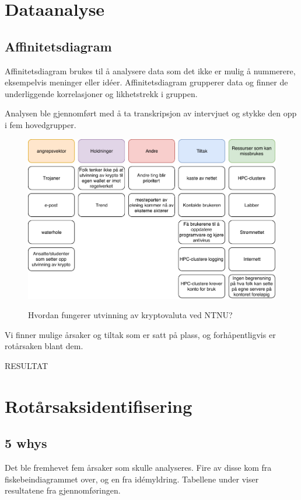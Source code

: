 \section{Dataanalyse}
\subsection{Affinitetsdiagram}
Affinitetsdiagram brukes til å analysere data som det ikke er mulig å nummerere, eksempelvis meninger eller idéer. Affinitetsdiagram grupperer data og finner de underliggende korrelasjoner og likhetstrekk i gruppen.

Analysen ble gjennomført med å ta transkripsjon av intervjuet og stykke den opp i fem hovedgrupper.     

\begin{figure}[H]
    \centering
    \includegraphics[scale=0.6]{case_3/bilder/AD.pdf}
    \label{fig:AD_miner}
    \caption{Hvordan fungerer utvinning av kryptovaluta ved NTNU?}
\end{figure}

Vi finner mulige årsaker og tiltak som er satt på plass, og forhåpentligvis er rotårsaken blant dem.

RESULTAT

\section{Rotårsaksidentifisering}
\subsection{5 whys}
Det ble fremhevet fem årsaker som skulle analyseres. Fire av disse kom fra fiskebeindiagrammet over, og en fra idémyldring. Tabellene under viser resultatene fra gjennomføringen. 

